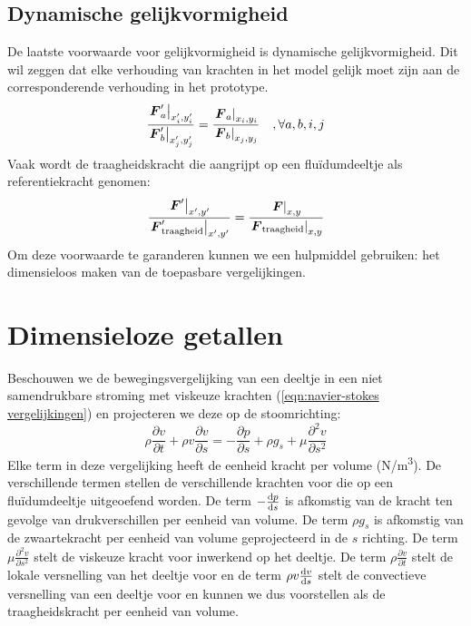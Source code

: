 	\subsection{Dynamische gelijkvormigheid}
De laatste voorwaarde voor gelijkvormigheid is dynamische gelijkvormigheid. Dit wil zeggen dat elke verhouding van krachten in het model gelijk moet zijn aan de corresponderende verhouding in het prototype.
\begin{equation}
	\dfrac{\left. \boldsymbol{F}'_a \right|_{x_i',y_i'}}{\left. \boldsymbol{F}'_b \right|_{x_j',y_j'}} = \dfrac{\left. \boldsymbol{F}_a \right|_{x_i,y_i}}{\left. \boldsymbol{F}_b \right|_{x_j,y_j}} \quad, \forall a,b,i,j
	\label{eqn:dynamische gelijkvormigheid}
\end{equation}
Vaak wordt de traagheidskracht die aangrijpt op een fluïdumdeeltje als referentiekracht genomen:
\begin{equation}
	\dfrac{\left. \boldsymbol{F}' \right|_{x',y'}}{\left. \boldsymbol{F}'_{\mathrm{traagheid}} \right|_{x',y'}} = \dfrac{\left. \boldsymbol{F} \right|_{x,y}}{\left. \boldsymbol{F}_{\mathrm{traagheid}} \right|_{x,y}}
	\label{eqn:dynamische gelijkvormigheid traagheid}
\end{equation}
Om deze voorwaarde te garanderen kunnen we een hulpmiddel gebruiken: het dimensieloos maken van de toepasbare vergelijkingen.

	\section{Dimensieloze getallen}
Beschouwen we de bewegingsvergelijking van een deeltje in een niet samendrukbare stroming met viskeuze krachten (\ref{eqn:navier-stokes vergelijkingen}) en projecteren we deze op de stoomrichting:
\begin{equation}
	\rho \frac{\partial v}{\partial t} + \rho v \frac{\partial v}{\partial s} = -\frac{\partial p}{\partial s} + \rho g_s + \mu \frac{\partial^2 v}{\partial s^2}
	\label{eqn:navier-stokes geprojecteerd}
\end{equation}
Elke term in deze vergelijking heeft de eenheid kracht per volume (\unit{N/m^3}). De verschillende termen stellen de verschillende krachten voor die op een fluïdumdeeltje uitgeoefend worden. De term $-\frac{\mathrm{d} p}{\mathrm{d} s}$ is afkomstig van de kracht ten gevolge van drukverschillen per eenheid van volume. De term $\rho g_s$ is afkomstig van de zwaartekracht per eenheid van volume geprojecteerd in de $s$ richting. De term $\mu \frac{\partial^2 v}{\partial s^2}$ stelt de viskeuze kracht voor inwerkend op het deeltje. De term $\rho \frac{\partial v}{\partial t}$ stelt de lokale versnelling van het deeltje voor en de term $\rho v \frac{\mathrm{d} v}{\mathrm{d} s}$ stelt de convectieve versnelling van een deeltje voor en kunnen we dus voorstellen als de traagheidskracht per eenheid van volume.

